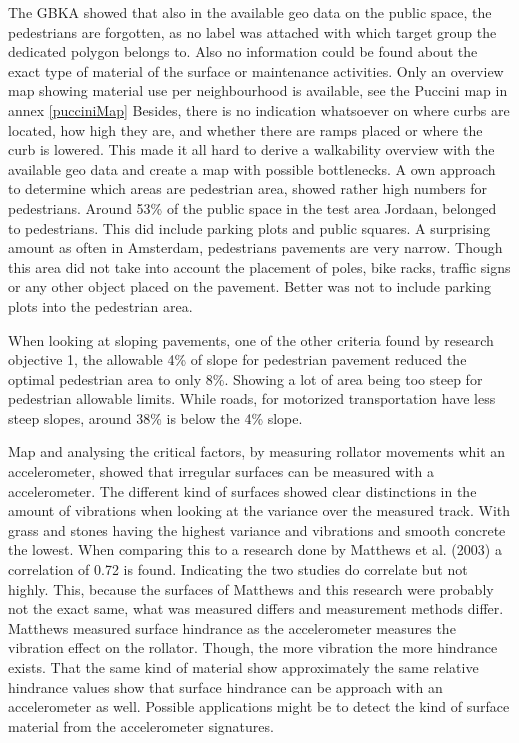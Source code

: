 The GBKA showed that also in the available geo data on the public space, the pedestrians are forgotten, as no label was attached with which target group the dedicated polygon belongs to. Also no information could be found about the exact type of material of the surface or maintenance activities. Only an overview map showing material use per neighbourhood is available, see the Puccini map in annex \ref{pucciniMap} 
Besides, there is no indication whatsoever on where curbs are located, how high they are, and whether there are ramps placed or where the curb is lowered. 
This made it all hard to derive a walkability overview with the available geo data and create a map with possible bottlenecks. A own approach to determine which areas are pedestrian area, showed rather high numbers for pedestrians. Around 53\% of the public space in the test area Jordaan, belonged to pedestrians. This did include parking plots and public squares. A surprising amount as often in Amsterdam, pedestrians pavements are very narrow. Though this area did not take into account the placement of poles, bike racks, traffic signs or any other object placed on the pavement. Better was not to include parking plots into the pedestrian area. 

When looking at sloping pavements, one of the other criteria found by research objective 1, the allowable 4\% of slope for pedestrian pavement reduced the optimal pedestrian area to only 8\%. Showing a lot of area being too steep for pedestrian allowable limits. While roads, for motorized transportation have less steep slopes, around 38\% is below the 4\% slope. 




Map and analysing the critical factors, by measuring rollator movements whit an accelerometer, showed that irregular surfaces can be measured with a accelerometer. The different kind of surfaces showed clear distinctions in the amount of vibrations when looking at the variance over the measured track. With grass and stones having the highest variance and vibrations and smooth concrete the lowest. When comparing this to a research done by Matthews et al. (2003) a correlation of 0.72 is found. Indicating the two studies do correlate but not highly. This, because the surfaces of Matthews and this research were probably not the exact same, what was measured differs and measurement methods differ. Matthews measured surface hindrance as the accelerometer measures the vibration effect on the rollator. Though, the more vibration the more hindrance exists. That the same kind of material show approximately the same relative hindrance values show that surface hindrance can be approach with an accelerometer as well. Possible applications might be to detect the kind of surface material from the accelerometer signatures. 

